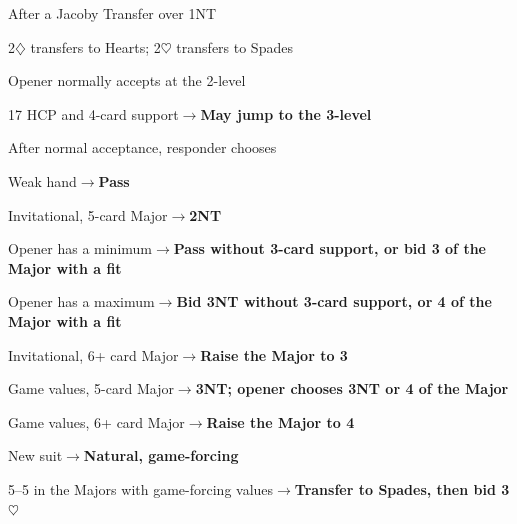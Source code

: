 \documentclass[10pt,letterpaper]{article}
\newcommand{\D}{\ensuremath{\diamondsuit}}
\newcommand{\Hh}{\ensuremath{\heartsuit}}
\begin{document}
\begin{minipage}[t]{0.485\textwidth}\vspace{0pt}

\begin{guidecard}{After a Jacoby Transfer over 1NT}
\begin{branches}
\item 2\D{} transfers to Hearts; 2\Hh{} transfers to Spades
\item Opener normally accepts at the 2-level
\begin{branches}
\item 17 HCP and 4-card support\;\ensuremath{\longrightarrow}\;\textbf{May jump to the 3-level}
\end{branches}
\item After normal acceptance, responder chooses
\begin{branches}
\item Weak hand\;\ensuremath{\longrightarrow}\;\textbf{Pass}
\item Invitational, 5-card Major\;\ensuremath{\longrightarrow}\;\textbf{2NT}
\begin{branches}
\item Opener has a minimum\;\ensuremath{\longrightarrow}\;\textbf{Pass without 3-card support, or bid 3 of the Major with a fit}
\item Opener has a maximum\;\ensuremath{\longrightarrow}\;\textbf{Bid 3NT without 3-card support, or 4 of the Major with a fit}
\end{branches}
\item Invitational, 6+ card Major\;\ensuremath{\longrightarrow}\;\textbf{Raise the Major to 3}
\item Game values, 5-card Major\;\ensuremath{\longrightarrow}\;\textbf{3NT; opener chooses 3NT or 4 of the Major}
\item Game values, 6+ card Major\;\ensuremath{\longrightarrow}\;\textbf{Raise the Major to 4}
\item New suit\;\ensuremath{\longrightarrow}\;\textbf{Natural, game-forcing}
\end{branches}
\item 5--5 in the Majors with game-forcing values\;\ensuremath{\longrightarrow}\;\textbf{Transfer to Spades, then bid 3\Hh{}}
\end{branches}
\end{guidecard}


\end{minipage}
\end{document}
